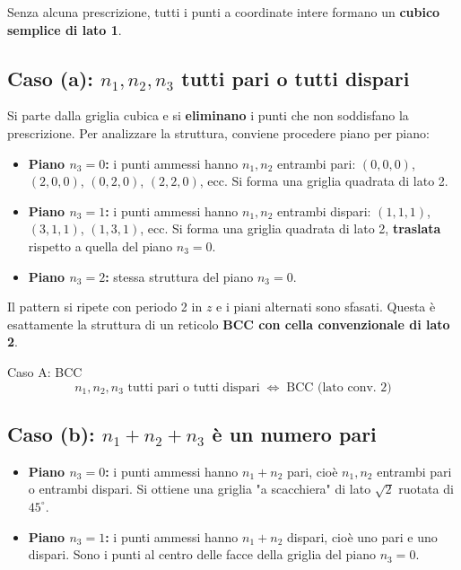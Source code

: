 Senza alcuna prescrizione, tutti i punti a coordinate intere formano un \textbf{cubico semplice di lato 1}.

\subsection*{Caso (a): $n_1, n_2, n_3$ tutti pari o tutti dispari}

Si parte dalla griglia cubica e si \textbf{eliminano} i punti che non soddisfano la prescrizione. Per analizzare la struttura, conviene procedere piano per piano:

\begin{itemize}
    \item \textbf{Piano $n_3 = 0$:} i punti ammessi hanno $n_1, n_2$ entrambi pari: $(0,0,0)$, $(2,0,0)$, $(0,2,0)$, $(2,2,0)$, ecc. Si forma una griglia quadrata di lato 2.
    \item \textbf{Piano $n_3 = 1$:} i punti ammessi hanno $n_1, n_2$ entrambi dispari: $(1,1,1)$, $(3,1,1)$, $(1,3,1)$, ecc. Si forma una griglia quadrata di lato 2, \textbf{traslata} rispetto a quella del piano $n_3 = 0$.
    \item \textbf{Piano $n_3 = 2$:} stessa struttura del piano $n_3 = 0$.
\end{itemize}

Il pattern si ripete con periodo 2 in $z$ e i piani alternati sono sfasati. Questa è esattamente la struttura di un reticolo \textbf{BCC con cella convenzionale di lato 2}.

\begin{equazione}{Caso A: BCC}
\begin{equation}
n_1, n_2, n_3 \text{ tutti pari o tutti dispari} \;\Longleftrightarrow\; \text{BCC (lato conv. 2)}
\end{equation}
\end{equazione}

\subsection*{Caso (b): $n_1 + n_2 + n_3$ è un numero pari}

\begin{itemize}
    \item \textbf{Piano $n_3 = 0$:} i punti ammessi hanno $n_1 + n_2$ pari, cioè $n_1, n_2$ entrambi pari o entrambi dispari. Si ottiene una griglia "a scacchiera" di lato $\sqrt{2}$ ruotata di $45^\circ$.
    \item \textbf{Piano $n_3 = 1$:} i punti ammessi hanno $n_1 + n_2$ dispari, cioè uno pari e uno dispari. Sono i punti al centro delle facce della griglia del piano $n_3 = 0$.
\end{itemize}

